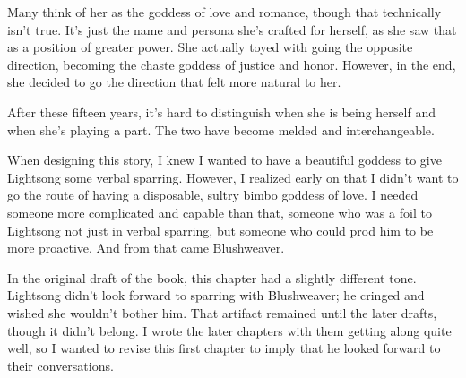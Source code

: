 Many think of her as the goddess of love and romance, though that technically isn’t true. It’s just the name and persona she’s crafted for herself, as she saw that as a position of greater power. She actually toyed with going the opposite direction, becoming the chaste goddess of justice and honor. However, in the end, she decided to go the direction that felt more natural to her.

After these fifteen years, it’s hard to distinguish when she is being herself and when she’s playing a part. The two have become melded and interchangeable.

When designing this story, I knew I wanted to have a beautiful goddess to give Lightsong some verbal sparring. However, I realized early on that I didn’t want to go the route of having a disposable, sultry bimbo goddess of love. I needed someone more complicated and capable than that, someone who was a foil to Lightsong not just in verbal sparring, but someone who could prod him to be more proactive. And from that came Blushweaver.

In the original draft of the book, this chapter had a slightly different tone. Lightsong didn’t look forward to sparring with Blushweaver; he cringed and wished she wouldn’t bother him. That artifact remained until the later drafts, though it didn’t belong. I wrote the later chapters with them getting along quite well, so I wanted to revise this first chapter to imply that he looked forward to their conversations.




